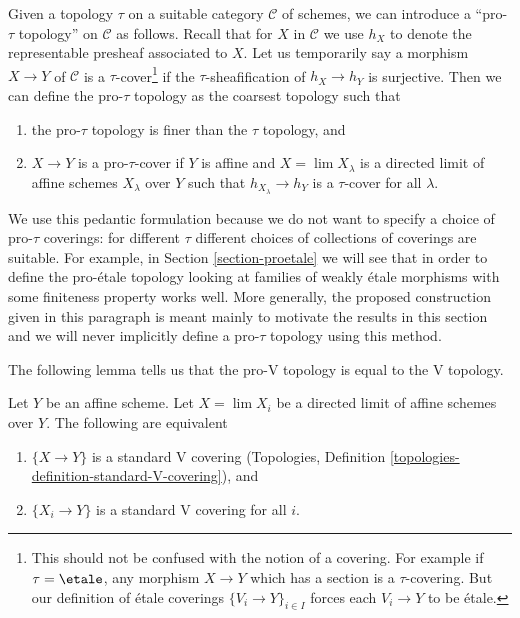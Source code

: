 \medskip\noindent
Given a topology $\tau$ on a suitable category $\mathcal{C}$
of schemes, we can introduce a ``pro-$\tau$ topology''
on $\mathcal{C}$ as follows. Recall that for $X$ in $\mathcal{C}$
we use $h_X$ to denote the representable presheaf associated to $X$.
Let us temporarily say a morphism $X \to Y$ of $\mathcal{C}$
is a $\tau$-cover\footnote{This should not be confused with
the notion of a covering. For example if $\tau = \etale$,
any morphism $X \to Y$ which has a section is a $\tau$-covering. But our
definition of \'etale coverings $\{V_i \to Y\}_{i \in I}$
forces each $V_i \to Y$ to be \'etale.}
if the $\tau$-sheafification of $h_X \to h_Y$
is surjective. Then we can define the pro-$\tau$ topology
as the coarsest topology such that
\begin{enumerate}
\item the pro-$\tau$ topology is finer than the $\tau$ topology, and
\item $X \to Y$ is a pro-$\tau$-cover if
$Y$ is affine and $X = \lim X_\lambda$ is a directed
limit of affine schemes $X_\lambda$ over $Y$ such that
$h_{X_\lambda} \to h_Y$ is a $\tau$-cover for all $\lambda$.
\end{enumerate}
We use this pedantic formulation because we do not want to
specify a choice of pro-$\tau$ coverings: for different $\tau$
different choices of collections of coverings are suitable.
For example, in Section \ref{section-proetale} we will see that
in order to define the pro-\'etale topology looking at families
of weakly \'etale morphisms with some finiteness property works well.
More generally, the proposed construction given in this paragraph is
meant mainly to motivate the results in this section and we will never
implicitly define a pro-$\tau$ topology using this method.

\medskip\noindent
The following lemma tells us that the
pro-V topology is equal to the V topology.

\begin{lemma}
\label{lemma-pro-V-V}
Let $Y$ be an affine scheme. Let $X = \lim X_i$ be a directed limit
of affine schemes over $Y$. The following are equivalent
\begin{enumerate}
\item $\{X \to Y\}$ is a standard V covering
(Topologies, Definition \ref{topologies-definition-standard-V-covering}), and
\item $\{X_i \to Y\}$ is a standard V covering for all $i$.
\end{enumerate}
\end{lemma}

